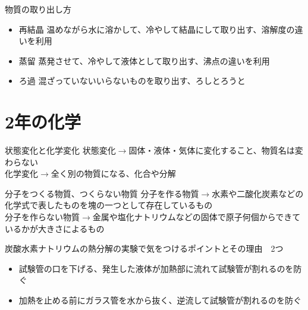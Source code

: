 \documentclass[10pt,dvipdfmx]{jsarticle}
\newcommand{\answer}[2]{{\color{orange}#2}}
\newcommand{\answer}[2]{\vspace{#1mm}}
\begin{document}
\begin{itembox}[l]{物質の取り出し方}
	\begin{Large}
		\begin{itemize}
			\item 再結晶 \answer{0}{
				      \normalsize 温めながら水に溶かして、冷やして結晶にして取り出す、溶解度の違いを利用}
			\item 蒸留 \answer{0}{\normalsize 蒸発させて、冷やして液体として取り出す、沸点の違いを利用}
			\item ろ過 \answer{0}{\normalsize 混ざっていないいらないものを取り出す、ろしとろうと}
		\end{itemize}
	\end{Large}
\end{itembox}

\newpage

\section{2年の化学}
\begin{itembox}[l]{状態変化と化学変化}
	\answer{10}{
		状態変化$\rightarrow$固体・液体・気体に変化すること、物質名は変わらない\\
		化学変化$\rightarrow$全く別の物質になる、化合や分解
	}
\end{itembox}



\begin{itembox}[l]{分子をつくる物質、つくらない物質}
	\answer{10}{
		分子を作る物質$\rightarrow$水素や二酸化炭素などの化学式で表したものを塊の一つとして存在しているもの\\
		分子を作らない物質$\rightarrow$金属や塩化ナトリウムなどの固体で原子何個からできているかが大きさによるもの
	}
\end{itembox}

\begin{itembox}[l]{炭酸水素ナトリウムの熱分解の実験で気をつけるポイントとその理由　2つ}
	\begin{Large}
		\begin{itemize}
			\item \answer{0}{\normalsize 試験管の口を下げる、発生した液体が加熱部に流れて試験管が割れるのを防ぐ}
			\item \answer{0}{\normalsize 加熱を止める前にガラス管を水から抜く、逆流して試験管が割れるのを防ぐ}
		\end{itemize}
	\end{Large}
\end{itembox}
\end{document}

